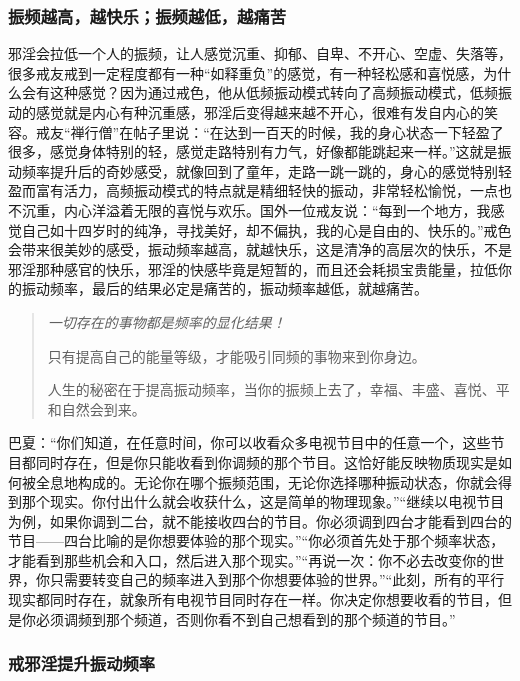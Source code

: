 \subsubsection{振频越高，越快乐；振频越低，越痛苦}

邪淫会拉低一个人的振频，让人感觉沉重、抑郁、自卑、不开心、空虚、失落等，很多戒友戒到一定程度都有一种“如释重负”的感觉，有一种轻松感和喜悦感，为什么会有这种感觉？因为通过戒色，他从低频振动模式转向了高频振动模式，低频振动的感觉就是内心有种沉重感，邪淫后变得越来越不开心，很难有发自内心的笑容。戒友“禅行僧”在帖子里说：“在达到一百天的时候，我的身心状态一下轻盈了很多，感觉身体特别的轻，感觉走路特别有力气，好像都能跳起来一样。”这就是振动频率提升后的奇妙感受，就像回到了童年，走路一跳一跳的，身心的感觉特别轻盈而富有活力，高频振动模式的特点就是精细轻快的振动，非常轻松愉悦，一点也不沉重，内心洋溢着无限的喜悦与欢乐。国外一位戒友说：“每到一个地方，我感觉自己如十四岁时的纯净，寻找美好，却不偏执，我的心是自由的、快乐的。”戒色会带来很美妙的感受，振动频率越高，就越快乐，这是清净的高层次的快乐，不是邪淫那种感官的快乐，邪淫的快感毕竟是短暂的，而且还会耗损宝贵能量，拉低你的振动频率，最后的结果必定是痛苦的，振动频率越低，就越痛苦。

\begin{quotation}\it
    一切存在的事物都是频率的显化结果！

    只有提高自己的能量等级，才能吸引同频的事物来到你身边。

    人生的秘密在于提高振动频率，当你的振频上去了，幸福、丰盛、喜悦、平和自然会到来。
\end{quotation}

巴夏：“你们知道，在任意时间，你可以收看众多电视节目中的任意一个，这些节目都同时存在，但是你只能收看到你调频的那个节目。这恰好能反映物质现实是如何被全息地构成的。无论你在哪个振频范围，无论你选择哪种振动状态，你就会得到那个现实。你付出什么就会收获什么，这是简单的物理现象。”“继续以电视节目为例，如果你调到二台，就不能接收四台的节目。你必须调到四台才能看到四台的节目——四台比喻的是你想要体验的那个现实。”“你必须首先处于那个频率状态，才能看到那些机会和入口，然后进入那个现实。”“再说一次：你不必去改变你的世界，你只需要转变自己的频率进入到那个你想要体验的世界。”“此刻，所有的平行现实都同时存在，就象所有电视节目同时存在一样。你决定你想要收看的节目，但是你必须调频到那个频道，否则你看不到自己想看到的那个频道的节目。”

\subsubsection{戒邪淫提升振动频率}

